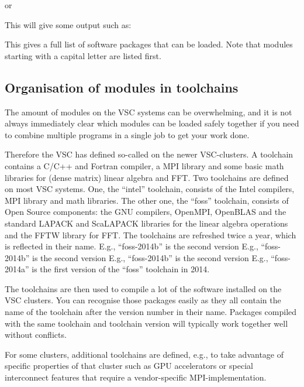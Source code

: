 or

\begin{prompt}
\end{prompt}

This will give some output such as:


This gives a full list of software packages that can be loaded. Note that
modules starting with a capital letter are listed first.

\subsection{Organisation of modules in toolchains}

The amount of modules on the VSC systems can be overwhelming, and it is not
always immediately clear which modules can be loaded safely together if you
need to combine multiple programs in a single job to get your work done.

Therefore the VSC has defined so-called  on the newer VSC-clusters.
A toolchain contains a C/C++ and Fortran compiler, a MPI library and some basic
math libraries for (dense matrix) linear algebra and FFT. Two toolchains are
defined on most VSC systems. One, the ``intel'' toolchain, consists of the Intel
compilers, MPI library and math libraries. The other one, the ``foss'' toolchain,
consists of Open Source components: the GNU compilers, OpenMPI, OpenBLAS and
the standard LAPACK and ScaLAPACK libraries for the linear algebra operations
and the FFTW library for FFT. The toolchains are refreshed twice a year,
which is reflected in their name.
\ifantwerpen
E.g., ``foss-2014b'' is the second version
\fi
\ifgent
E.g., ``foss-2014b'' is the second version
\fi
\ifbrussel
E.g., ``foss-2014b'' is the second version
\fi
\ifleuven
E.g., ``foss-2014a'' is the first version
\fi
of the ``foss'' toolchain in 2014.

The toolchains are then used to compile a lot of the software installed on
the VSC clusters. You can recognise those packages easily as they all contain the
name of the toolchain after the version number in their name. Packages
compiled with the same toolchain and toolchain version will typically work
together well without conflicts.

For some clusters, additional toolchains are defined, e.g., to take advantage
of specific properties of that cluster such as GPU accelerators or special
interconnect features that require a vendor-specific MPI-implementation.

